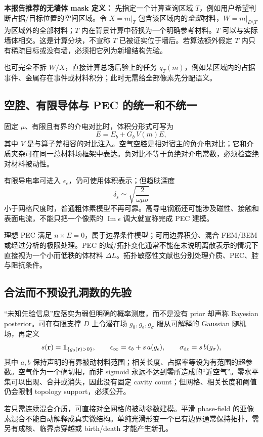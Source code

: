 \textbf{本报告推荐的无墙体 mask 定义：} 先指定一个计算查询区域 $T$，例如用户希望判断占据/目标位置的空间区域。令 $X=m|_T$ 包含该区域内的\emph{全部}材料，$W=m|_{D\setminus T}$ 为区域外的全部材料；$T$ 内在背景计算中替换为一个明确参考材料。$T$ 可以与实际墙体相交。这是计算分块，不宣称 $T$ 已被证实位于墙后。若算法额外假定 $T$ 内只有稀疏目标或没有墙，必须把它列为新增结构先验。

也可完全不拆 $W/X$，直接计算总场后验上的任务 $q_T(m)$，例如某区域内的占据事件、金属存在事件或材料积分；此时无需给全部像素先分配语义。

\subsection{空腔、有限导体与 PEC 的统一和不统一}
固定 $\mu$、有限且有界的介电对比时，体积分形式可写为
\[
E=E_b+G_b\,V(m)E,
\]
其中 $V$ 是与算子差相容的对比注入。空气空腔是相对宿主的负介电对比；它和介质夹杂可在同一总材料场框架中表达。负对比不等于负绝对介电常数，必须检查绝对材料被动性。

有限导电率可进入 $\epsilon_c$，仍可使用体积表示；但趋肤深度
\[
\delta_s\simeq\sqrt{\frac{2}{\omega\mu\sigma}}
\]
小于网格尺度时，普通粗体素模型不再可靠。高导电钢筋还可能涉及磁性、接触和表面电流，不能只把一个像素的 $\operatorname{Im}\epsilon$ 调大就宣称完成 PEC 建模。

理想 PEC 满足 $n\times E=0$，属于边界条件模型；可用边界积分、混合 FEM/BEM 或经过分析的极限处理。PEC 的域/拓扑变化通常不能在未说明离散表示的情况下直接视为一个小而低秩的体材料 $\Delta L$。拓扑敏感性文献也分别处理介质、PEC、腔与阻抗条件。\cite{L_Topology}

\subsection{合法而不预设孔洞数的先验}
“未知先验信息”应落实为弱但明确的概率测度，而不是没有 prior 却声称 Bayesian posterior。可在有限支撑 $D$ 上令潜在场 $g_0,g_\epsilon,g_\sigma$ 服从可解释的 Gaussian 随机场，再定义
\[
s(\mathbf r)=\mathbf1_{\{g_0(\mathbf r)>0\}},\qquad
\epsilon_\infty=\epsilon_b+s\,a(g_\epsilon),\qquad
\sigma_{\rm dc}=s\,b(g_\sigma),
\]
其中 $a,b$ 保持声明的有界被动材料范围；相关长度、占据率等设为有范围的超参数。空气作为一个确切相，而非 sigmoid 永远不达到零所造成的“近空气”。零水平集可以出现、合并或消失，因此没有固定 cavity count；但网格、相关长度和阈值仍会限制 topology support，必须公开。

若只需连续混合介质，可直接对全网格的被动参数建模。平滑 phase-field 的亚像素混合不能自动解释成真实微结构。单纯光滑形变一个已有边界通常保持拓扑，需另有成核、临界点穿越或 birth/death 才能产生新孔。

